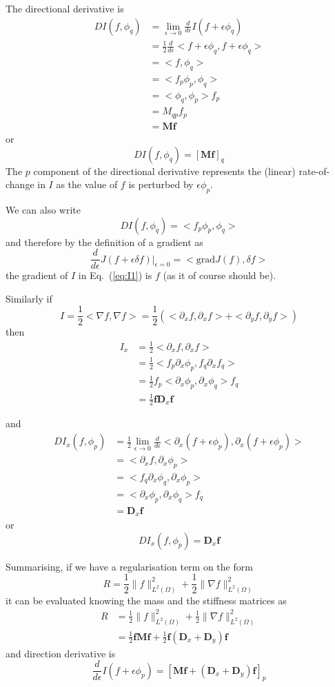 \documentclass[10pt,a4paper]{book}
\newcommand{\p}{\partial}
\begin{document}
The directional derivative is
\begin{align*}
D I(f,\phi_q) &= \lim_{\epsilon \to 0} \frac{d}{d \epsilon} I(f+ \epsilon \phi_q) \\
              &= \frac{1}{2} \frac{d}{d \epsilon} < f+\epsilon \phi_q , f+\epsilon \phi_q> \\
              &= <f , \phi_q > \\
              &= <f_p \phi_p , \phi_q > \\
              &= < \phi_q , \phi_p > f_p \\
              &= M_{qp} f_p\\
              &= \bm{M} \bm{f}
\end{align*}
or
\[
D I(f,\phi_q) = [\bm{M} \bm{f}]_q
\]
The $p$ component of the directional derivative represents the (linear)
rate-of-change in $I$ as the value of $f$ is perturbed by
$\epsilon \phi_p$.

We can also write
\[ 
D I(f,\phi_q) = < f_p \phi_p , \phi_q> 
\]
and therefore by the definition of a gradient as
\[
\frac{d}{d \epsilon} J(f+\epsilon \delta f)|_{\epsilon=0} = < \mathrm{grad} J(f), \delta f>
\]
the gradient of $I$ in  Eq.~(\ref{eq:I1}) is $f$ (as it of course should be).

Similarly if
\[ 
I=\frac{1}{2} < \nabla f , \nabla f> = \frac{1}{2} ( <\p_x f, \p_x f> + < \p_y f, \p_y f> )
\]
then
\begin{align*}
 I_x & = \frac{1}{2} <\p_x f, \p_x f> \\ 
     &= \frac{1}{2} < f_p \p_x \phi_p, f_q \p_x f_q> \\
     &= \frac{1}{2} f_p <  \p_x \phi_p,  \p_x \phi_q> f_q\\
     &= \frac{1}{2} \bm{f} \bm{D}_x \bm{f}
\end{align*}

and
\begin{align*} 
D I_x(f,\phi_p) &= \frac{1}{2}\lim_{\epsilon \to 0} \frac{d}{d \epsilon} < \p_x (f +\epsilon \phi_p) , \p_x (f+\epsilon \phi_p) > \\
              &=  <\p_x f  , \p_x \phi_p > \\
              &=  <f_q \p_x \phi_q  , \p_x \phi_p > \\
              &=  <\p_x \phi_p  , \p_x \phi_q > f_q\\
              &= \bm{D}_x \bm{f}
\end{align*}
or
\[
D I_x(f,\phi_p) = \bm{D}_x \bm{f}
\]


Summarising, if we have a regularisation term on the form
\[
R=\frac{1}{2} \| f \|^2_{L^2(\Omega)} + \frac{1}{2} \| \nabla f \|^2_{L^2(\Omega)}
\] 
it can be evaluated knowing the mass and the stiffness matrices as
\begin{align*}  
R &= \frac{1}{2} \| f \|^2_{L^2(\Omega)} + \frac{1}{2} \| \nabla f \|^2_{L^2(\Omega)} \\
  &= \frac{1}{2} \bm{f} \bm{M} \bm{f}  + \frac{1}{2} \bm{f} (\bm{D}_x + \bm{D}_y) \bm{f}
\end{align*}
and direction derivative is 
\[ \frac{d}{d\epsilon} I(f+\epsilon \phi_p) = [\bm{M} \bm{f} + (\bm{D}_x  + \bm{D}_y) \bm{f} ]_p \]
\end{document}
